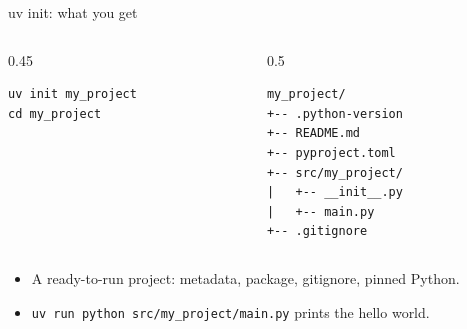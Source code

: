 \documentclass[aspectratio=169]{beamer}
\begin{document}
\begin{frame}[fragile]{uv init: what you get}
  \begin{columns}[T]
    \begin{column}{0.45\textwidth}
      \begin{lstlisting}
uv init my_project
cd my_project
      \end{lstlisting}
    \end{column}
    \begin{column}{0.5\textwidth}
      \begin{lstlisting}
my_project/
+-- .python-version
+-- README.md
+-- pyproject.toml
+-- src/my_project/
|   +-- __init__.py
|   +-- main.py
+-- .gitignore
      \end{lstlisting}
    \end{column}
  \end{columns}
  \vspace{0.2cm}
  \begin{itemize}
    \item A ready-to-run project: metadata, package, gitignore, pinned Python.
    \item \texttt{uv run python src/my\_project/main.py} prints the hello world.
  \end{itemize}
\end{frame}
\end{document}
